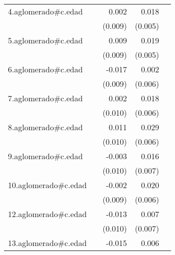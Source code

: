 {\begin{longtable}{l*{4}{D{.}{.}{-1}}}
\addlinespace
4.aglomerado#c.edad&                     &       0.002         &       0.018\sym{***}&                     \\
            &                     &     (0.009)         &     (0.005)         &                     \\
\addlinespace
5.aglomerado#c.edad&                     &       0.009         &       0.019\sym{***}&                     \\
            &                     &     (0.009)         &     (0.005)         &                     \\
\addlinespace
6.aglomerado#c.edad&                     &      -0.017         &       0.002         &                     \\
            &                     &     (0.009)         &     (0.006)         &                     \\
\addlinespace
7.aglomerado#c.edad&                     &       0.002         &       0.018\sym{**} &                     \\
            &                     &     (0.010)         &     (0.006)         &                     \\
\addlinespace
8.aglomerado#c.edad&                     &       0.011         &       0.029\sym{***}&                     \\
            &                     &     (0.010)         &     (0.006)         &                     \\
\addlinespace
9.aglomerado#c.edad&                     &      -0.003         &       0.016\sym{*}  &                     \\
            &                     &     (0.010)         &     (0.007)         &                     \\
\addlinespace
10.aglomerado#c.edad&                     &      -0.002         &       0.020\sym{***}&                     \\
            &                     &     (0.009)         &     (0.006)         &                     \\
\addlinespace
12.aglomerado#c.edad&                     &      -0.013         &       0.007         &                     \\
            &                     &     (0.010)         &     (0.007)         &                     \\
\addlinespace
13.aglomerado#c.edad&                     &      -0.015         &       0.006         &                     \\

\end{longtable}}
